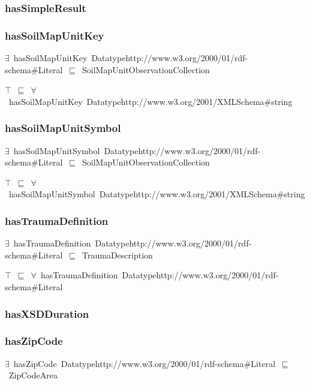 \documentclass{article}
\begin{document}
\subsubsection*{hasSimpleResult}

\subsubsection*{hasSoilMapUnitKey}

\ensuremath{\exists}~hasSoilMapUnitKey~Datatypehttp://www.w3.org/2000/01/rdf-schema#Literal~\ensuremath{\sqsubseteq}~SoilMapUnitObservationCollection

\ensuremath{\top}~\ensuremath{\sqsubseteq}~\ensuremath{\forall}~hasSoilMapUnitKey~Datatypehttp://www.w3.org/2001/XMLSchema#string

\subsubsection*{hasSoilMapUnitSymbol}

\ensuremath{\exists}~hasSoilMapUnitSymbol~Datatypehttp://www.w3.org/2000/01/rdf-schema#Literal~\ensuremath{\sqsubseteq}~SoilMapUnitObservationCollection

\ensuremath{\top}~\ensuremath{\sqsubseteq}~\ensuremath{\forall}~hasSoilMapUnitSymbol~Datatypehttp://www.w3.org/2001/XMLSchema#string

\subsubsection*{hasTraumaDefinition}

\ensuremath{\exists}~hasTraumaDefinition~Datatypehttp://www.w3.org/2000/01/rdf-schema#Literal~\ensuremath{\sqsubseteq}~TraumaDescription

\ensuremath{\top}~\ensuremath{\sqsubseteq}~\ensuremath{\forall}~hasTraumaDefinition~Datatypehttp://www.w3.org/2000/01/rdf-schema#Literal

\subsubsection*{hasXSDDuration}

\subsubsection*{hasZipCode}

\ensuremath{\exists}~hasZipCode~Datatypehttp://www.w3.org/2000/01/rdf-schema#Literal~\ensuremath{\sqsubseteq}~ZipCodeArea
\end{document}
